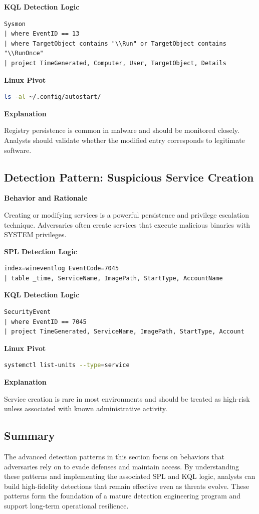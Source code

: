 \textbf{KQL Detection Logic}
\begin{lstlisting}
Sysmon
| where EventID == 13
| where TargetObject contains "\\Run" or TargetObject contains "\\RunOnce"
| project TimeGenerated, Computer, User, TargetObject, Details
\end{lstlisting}

\textbf{Linux Pivot}
\begin{lstlisting}[language=bash]
ls -al ~/.config/autostart/
\end{lstlisting}

\textbf{Explanation}

Registry persistence is common in malware and should be monitored closely. Analysts should validate whether the modified entry corresponds to legitimate software.

\subsection*{Detection Pattern: Suspicious Service Creation}

\textbf{Behavior and Rationale}

Creating or modifying services is a powerful persistence and privilege escalation technique. Adversaries often create services that execute malicious binaries with SYSTEM privileges.

\textbf{SPL Detection Logic}
\begin{lstlisting}
index=wineventlog EventCode=7045
| table _time, ServiceName, ImagePath, StartType, AccountName
\end{lstlisting}

\textbf{KQL Detection Logic}
\begin{lstlisting}
SecurityEvent
| where EventID == 7045
| project TimeGenerated, ServiceName, ImagePath, StartType, Account
\end{lstlisting}

\textbf{Linux Pivot}
\begin{lstlisting}[language=bash]
systemctl list-units --type=service
\end{lstlisting}

\textbf{Explanation}

Service creation is rare in most environments and should be treated as high-risk unless associated with known administrative activity.

\subsection*{Summary}

The advanced detection patterns in this section focus on behaviors that adversaries rely on to evade defenses and maintain access. By understanding these patterns and implementing the associated SPL and KQL logic, analysts can build high-fidelity detections that remain effective even as threats evolve. These patterns form the foundation of a mature detection engineering program and support long-term operational resilience.
